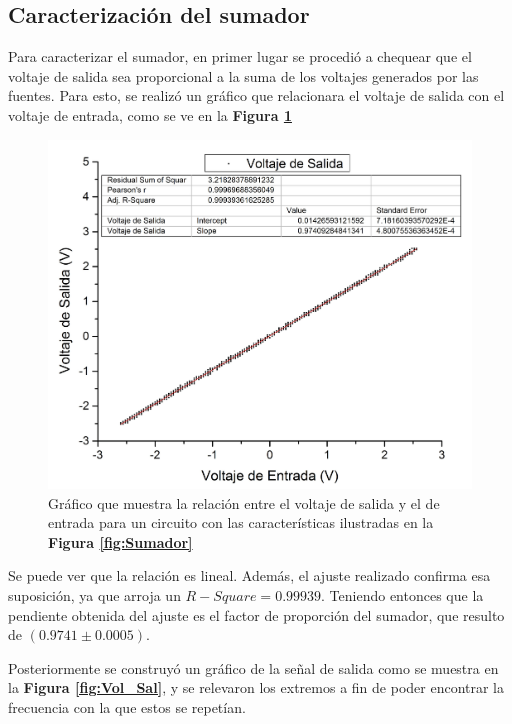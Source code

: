 \documentclass[11pt,a4paper]{article}
\begin{document}
\newpage
\subsection{Caracterización del sumador}

Para caracterizar el sumador, en primer lugar se procedió a chequear que el voltaje de salida sea proporcional a la suma de los voltajes generados por las fuentes. Para esto, se realizó un gráfico que relacionara el voltaje de salida con el voltaje de entrada, como se ve en la \textbf{Figura \ref{fig:S_vs_E}}

\begin{figure}[h]
\centering
\includegraphics[scale=0.4]{Salida_vs_Entrada}
\caption{Gráfico que muestra la relación entre el voltaje de salida y el de entrada para un circuito con las características ilustradas en la \textbf{Figura \ref{fig:Sumador}}}
\label{fig:S_vs_E}
\end{figure}

Se puede ver que la relación es lineal. Además, el ajuste realizado confirma esa suposición, ya que arroja un $R-Square=0.99939$. Teniendo entonces que la pendiente obtenida del ajuste es el factor de proporción del sumador, que resulto de $(0.9741 \pm 0.0005)$. 

Posteriormente se construyó un gráfico de la señal de salida como se muestra en la \textbf{Figura \ref{fig:Vol_Sal}}, y se relevaron los extremos a fin de poder encontrar la frecuencia con la que estos se repetían.
\end{document}
